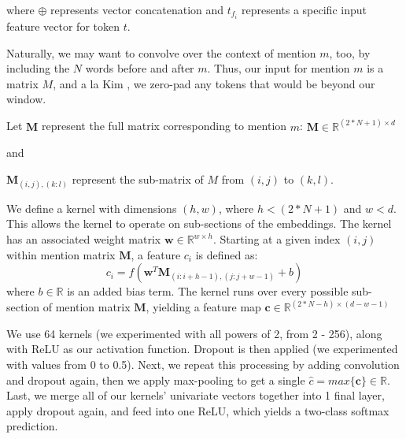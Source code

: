 \documentclass[11pt,a4paper]{article}
\begin{document}
where $\oplus$ represents vector concatenation and $t_{f_{i}}$ represents a specific input feature vector for token $t$.

Naturally, we may want to convolve over the context of mention $m$, too, by including the $N$ words before and after $m$.  Thus, our input for mention $m$ is a matrix $M$, and a la Kim , we zero-pad any tokens that would be beyond our window.

\vspace{3mm}

Let $\textbf{M}$ represent the full matrix corresponding to mention $m$: $\textbf{M} \in \mathbb{R}^{(2*N+1) \times d}$

\vspace{1mm}

and

\vspace{1mm}

$\textbf{M}_{(i,j),(k:l)}$ represent the sub-matrix of $M$ from $(i,j)$ to $(k,l)$.

\vspace{3mm}

We define a kernel with dimensions $(h,w)$, where $h < (2*N+1)$ and $w < d$.  This allows the kernel to operate on sub-sections of the embeddings.  The kernel has an associated weight matrix $\textbf{w} \in \mathbb{R}^{w \times h}$.  Starting at a given index $(i,j)$ within mention matrix $\textbf{M}$, a feature $c_{i}$ is defined as:
\begin{equation}
c_{i} = f(\textbf{w}^{T}\textbf{M}_{(i:i+h-1),(j:j+w-1)} + b)
\end{equation}
where $b \in \mathbb{R}$ is an added bias term.  The kernel runs over every possible sub-section of mention matrix $\textbf{M}$, yielding a feature map $\textbf{c} \in \mathbb{R}^{(2*N-h) \times (d-w-1)}$

\vspace{3mm}

We use 64 kernels (we experimented with all powers of 2, from 2 - 256), along with ReLU as our activation function.  Dropout is then applied (we experimented with values from 0 to 0.5).  Next, we repeat this processing by adding convolution and dropout again, then we apply max-pooling to get a single $\hat{c} = max\{\textbf{c\}} \in \mathbb{R}$. Last, we merge all of our kernels' univariate vectors together into 1 final layer, apply dropout again, and feed into one ReLU, which yields a two-class softmax prediction.
\end{document}
